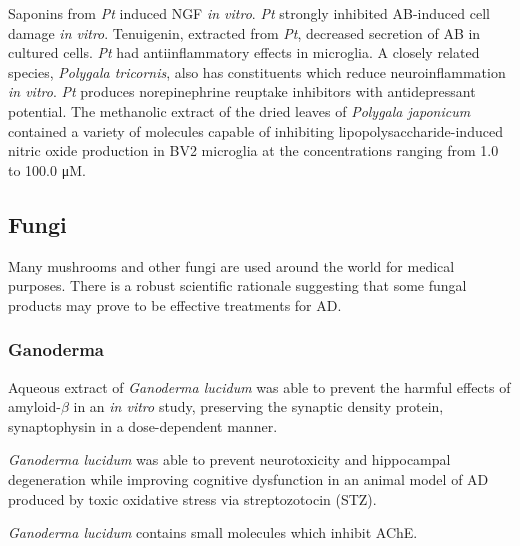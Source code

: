 Saponins from \textit{Pt} induced NGF \textit{in vitro}.
\cite{yabe2003induction}
\textit{Pt} strongly inhibited AB-induced cell damage \textit{in vitro}.
\cite{naito2006characterization}
Tenuigenin, extracted from \textit{Pt},
decreased secretion of AB in cultured cells.
\cite{jia2004tenuigenin}
\textit{Pt} had antiinflammatory effects in microglia.
\cite{cheong2011anti}
A closely related species, \textit{Polygala tricornis},
also has constituents which reduce
neuroinflammation \textit{in vitro}.
\cite{li2012anti}
\textit{Pt} produces norepinephrine reuptake inhibitors
with antidepressant potential.
\cite{cheng2006antidepressant}
The methanolic extract of the dried leaves of \textit{Polygala japonicum}
contained a variety of molecules capable of
inhibiting lipopolysaccharide-induced nitric oxide production in BV2 microglia
at the concentrations ranging from 1.0 to 100.0 μM.
\cite{kim2009chemical}













\subsection{Fungi}

Many mushrooms and other fungi are used around the world for medical purposes.
There is a robust scientific rationale suggesting that some
fungal products may prove to be effective treatments for AD.

\subsubsection{Ganoderma}

Aqueous extract of \textit{Ganoderma lucidum}
was able to prevent the harmful effects of
amyloid-$\beta$ in an \textit{in vitro} study,
preserving the synaptic density protein, synaptophysin
in a dose-dependent manner.
\cite{lai2008antagonizing}

\textit{Ganoderma lucidum} was able to prevent neurotoxicity and
hippocampal degeneration while improving cognitive dysfunction in an animal model
of AD produced by toxic oxidative stress via streptozotocin (STZ).
\cite{zhou2012neuroprotective}

\textit{Ganoderma lucidum} contains small molecules which inhibit AChE.
\cite{lee2011selective}

